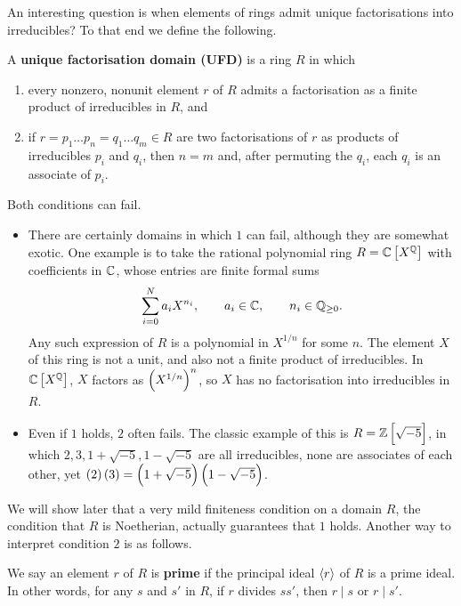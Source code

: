 An interesting question is when elements of rings admit unique factorisations into irreducibles? To that end we define the following.

\begin{definition}
A \textbf{unique factorisation domain (UFD)} is a ring $ R $ in which
\begin{enumerate}
\item every nonzero, nonunit element $ r $ of $ R $ admits a factorisation as a finite product of irreducibles in $ R $, and
\item if $ r = p_1 \dots p_n = q_1 \dots q_m \in R $ are two factorisations of $ r $ as products of irreducibles $ p_i $ and $ q_i $, then $ n = m $ and, after permuting the $ q_i $, each $ q_i $ is an associate of $ p_i $.
\end{enumerate}
\end{definition}

Both conditions can fail.

\begin{example*}
\hfill
\begin{itemize}
\item There are certainly domains in which $ 1 $ can fail, although they are somewhat exotic. One example is to take the rational polynomial ring $ R = \CC\sbr{X^\QQ} $ with coefficients in $ \mathbb{C} $, whose entries are finite formal sums
$$ \sum_{i = 0}^N a_iX^{n_i}, \qquad a_i \in \mathbb{C}, \qquad n_i \in \mathbb{Q}_{\ge 0}. $$
Any such expression of $ R $ is a polynomial in $ X^{1 / n} $ for some $ n $. The element $ X $ of this ring is not a unit, and also not a finite product of irreducibles. In $ \CC\sbr{X^\QQ} $, $ X $ factors as $ \br{X^{1 / n}}^n $, so $ X $ has no factorisation into irreducibles in $ R $.
\item Even if $ 1 $ holds, $ 2 $ often fails. The classic example of this is $ R = \ZZ\sbr{\sqrt{-5}} $, in which $ 2, 3, 1 + \sqrt{-5}, 1 - \sqrt{-5} $ are all irreducibles, none are associates of each other, yet $ \br{2}\br{3} = \br{1 + \sqrt{-5}}\br{1 - \sqrt{-5}} $.
\end{itemize}
\end{example*}

We will show later that a very mild finiteness condition on a domain $ R $, the condition that $ R $ is Noetherian, actually guarantees that $ 1 $ holds. Another way to interpret condition $ 2 $ is as follows.

\begin{definition}
We say an element $ r $ of $ R $ is \textbf{prime} if the principal ideal $ \left\langle r \right\rangle $ of $ R $ is a prime ideal. In other words, for any $ s $ and $ s' $ in $ R $, if $ r $ divides $ ss' $, then $ r \mid s $ or $ r \mid s' $.
\end{definition}

